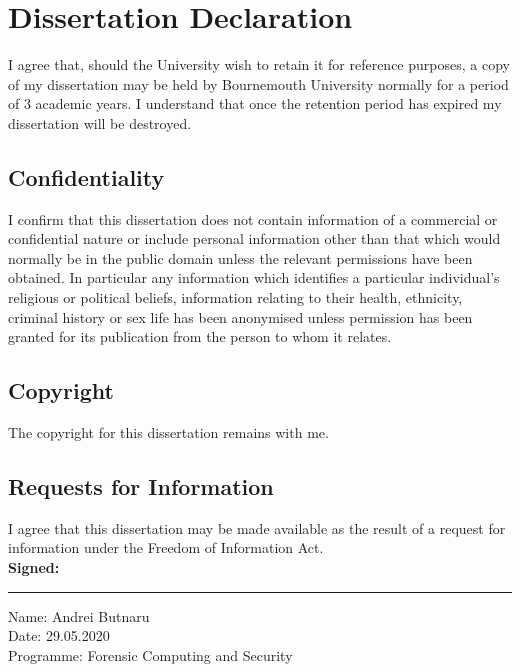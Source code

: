 \chapter*{Dissertation Declaration}
{\linespread{1.0} %
	I agree that, should the University wish to retain it for reference purposes, a copy of my dissertation may be held by Bournemouth University normally for a period of 3 academic years. I understand that once the retention period has expired my dissertation will be destroyed.

	\section*{Confidentiality}
	I confirm that this dissertation does not contain information of a commercial or confidential nature or include personal information other than that which would normally be in the public domain unless the relevant permissions have been obtained. In particular any information which identifies a particular individual's religious or political beliefs, information relating to their health, ethnicity, criminal history or sex life has been anonymised unless permission has been granted for its publication from the person to whom it relates.

	\section*{Copyright}
	The copyright for this dissertation remains with me.

	\section*{Requests for Information}
	I agree that this dissertation may be made available as the result of a request for information under the Freedom of Information Act.
	\\ \newline \newline
	\textbf{Signed:}
	\hrule width 0.5\textwidth
	\vspace{6pt}
	\noindent
	Name: Andrei Butnaru
	\\
	Date: 29.05.2020
	\\
	Programme: Forensic Computing and Security
}